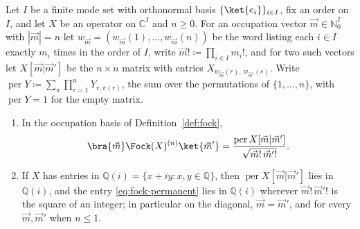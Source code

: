 
\begin{lemma}\label{lem:fock-permanent}
Let $I$ be a finite mode set with orthonormal basis $\{\ket{e_i}\}_{i\in I}$,
fix an order on $I$, and let $X$ be an operator on $\mathbb{C}^{I}$ and
$n\ge0$. For an occupation vector $\vec m\in\mathbb{N}_0^{I}$ with
$|\vec m|=n$ let $w_{\vec m}=(w_{\vec m}(1),\dots,w_{\vec m}(n))$ be the word
listing each $i\in I$ exactly $m_i$ times in the order of $I$, write
$\vec m!\coloneqq\prod_{i\in I}m_i!$, and for two such vectors let
$X[\vec m|\vec m']$ be the $n\times n$ matrix with entries
$X_{w_{\vec m}(r),\,w_{\vec m'}(s)}$. Write
$\operatorname{per}Y\coloneqq\sum_{\pi}\prod_{r=1}^{n}Y_{r,\pi(r)}$, the sum
over the permutations of $\{1,\dots,n\}$, with $\operatorname{per}Y=1$ for
the empty matrix.
\begin{enumerate}[label=(\roman*),leftmargin=3.0em]
\item In the occupation basis of Definition~\ref{def:fock},
  \begin{equation}\label{eq:fock-permanent}
    \bra{\vec m}\Fock(X)^{(n)}\ket{\vec m'}
    =\frac{\operatorname{per}X[\vec m|\vec m']}{\sqrt{\vec m!\,\vec m'!}} .
  \end{equation}
\item If $X$ has entries in $\mathbb{Q}(i)=\{x+iy:x,y\in\mathbb{Q}\}$, then
  $\operatorname{per}X[\vec m|\vec m']$ lies in $\mathbb{Q}(i)$, and the entry
  \eqref{eq:fock-permanent} lies in $\mathbb{Q}(i)$ wherever
  $\vec m!\,\vec m'!$ is the square of an integer; in particular on the
  diagonal, $\vec m=\vec m'$, and for every $\vec m,\vec m'$ when $n\le1$.
\end{enumerate}
\end{lemma}


